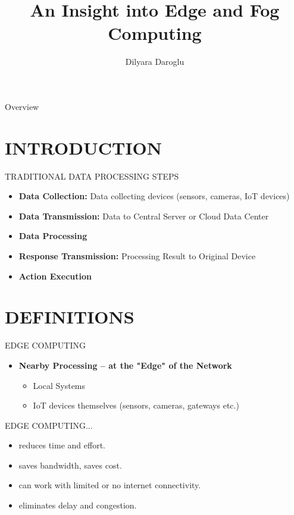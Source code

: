 \documentclass[aspectratio=169,xcolor=dvipsnames]{beamer}
\title{An Insight into Edge and Fog Computing}
\author{Dilyara Daroglu}
\institute
{
    Wissenschaftl. Arbeitstechniken u. Präsentation \\
    Paris Lodron University of Salzburg 
}
\date{}
\begin{document}
\begin{frame}
    \titlepage
\end{frame}

\begin{frame}{Overview}
    \tableofcontents
\end{frame}

\section{INTRODUCTION}

\begin{frame}{TRADITIONAL DATA PROCESSING STEPS}
    \begin{itemize}
        \item \textbf{Data Collection:} Data collecting devices (sensors, cameras, IoT
devices)
        \item \textbf{Data Transmission:} Data to Central Server or Cloud Data Center
        \item \textbf{Data Processing}
        \item \textbf{Response Transmission:} Processing Result to Original Device
        \item \textbf{Action Execution}
    \end{itemize}
\end{frame}


\section{DEFINITIONS}

\begin{frame}{EDGE COMPUTING}
    \begin{itemize}
        \item \textbf{Nearby Processing – at the
"Edge" of the Network}
        \begin{itemize}
            \item Local Systems
            \item IoT devices themselves (sensors,
            cameras, gateways etc.)
        \end{itemize}
    \end{itemize}
\end{frame}
\begin{frame}{EDGE COMPUTING...}
    \begin{itemize}
        \item reduces time and effort.
        \item saves bandwidth, saves cost.
        \item can work with limited or no internet connectivity.
        \item eliminates delay and congestion.
    \end{itemize}
\end{frame}
\end{document}
